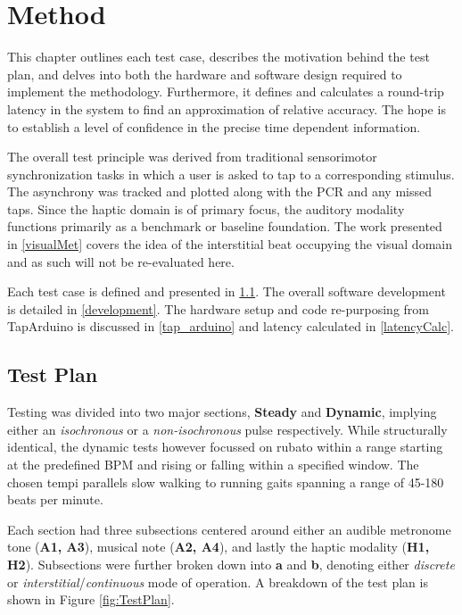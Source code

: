 \chapter{Method}
This chapter outlines each test case, describes the motivation behind the test plan, and delves into both the hardware and software design required to implement the methodology. Furthermore, it defines and calculates a round-trip latency in the system to find an approximation of relative accuracy. The hope is to establish a level of confidence in the precise time dependent information.

The overall test principle was derived from traditional sensorimotor synchronization tasks in which a user is asked to tap to a corresponding stimulus. The asynchrony was tracked and plotted along with the PCR and any missed taps. Since the haptic domain is of primary focus, the auditory modality functions primarily as a benchmark or baseline foundation. The work presented in \ref{visualMet} covers the idea of the interstitial beat occupying the visual domain and as such will not be re-evaluated here.

Each test case is defined and presented in \ref{testPlan}. The overall software development is detailed in \ref{development}. The hardware setup and code re-purposing from TapArduino is discussed in \ref{tap_arduino} and latency calculated in \ref{latencyCalc}.

\section{Test Plan} \label{testPlan}
Testing was divided into two major sections, \textbf{Steady} and \textbf{Dynamic}, implying either an \textit{isochronous} or a \textit{non-isochronous} pulse respectively. While structurally identical, the dynamic tests however focussed on rubato within a range starting at the predefined BPM and rising or falling within a specified window. The chosen tempi parallels slow walking to running gaits spanning a range of 45-180 beats per minute.

Each section had three subsections centered around either an audible metronome tone (\textbf{A1, A3}), musical note (\textbf{A2, A4}), and lastly the haptic modality (\textbf{H1, H2}). Subsections were further broken down into \textbf{a} and \textbf{b}, denoting either \textit{discrete} or \textit{interstitial}/\textit{continuous} mode of operation. A breakdown of the test plan is shown in Figure \ref{fig:TestPlan}.

